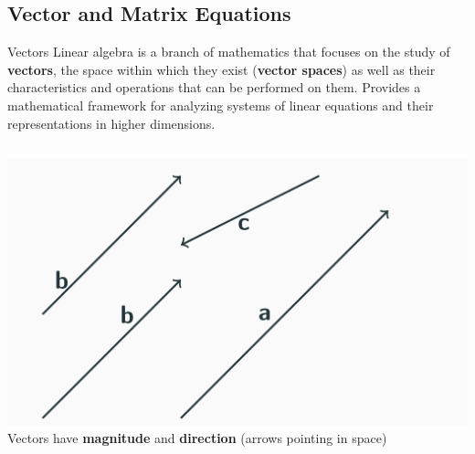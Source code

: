 \documentclass[10pt, aspectratio=169]{beamer}
\begin{document}
\subsection{Vector and Matrix Equations}
\begin{frame}{Vectors}
Linear algebra is a branch of mathematics that focuses on the study of \textbf{vectors}, the space within which they exist (\textbf{vector spaces}) as well as their characteristics and operations that can be performed on them.
Provides a mathematical framework for analyzing systems of linear equations and their representations in higher dimensions.

\begin{columns}
    \begin{column}{0.6\textwidth}
    \includegraphics[width=\textwidth]{figures/vectors.png}
    Vectors have \textbf{magnitude} and \textbf{direction} (arrows pointing in space)
    

\end{column}
\end{columns}
\end{frame}
\end{document}
